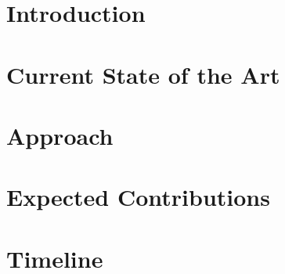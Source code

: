 \documentclass{article}
\author{
    Lillian Tsai\\
    Massachusetts Institute of Technology\\
    \texttt{tsilyai@mit.edu}
}
\date{\mydate}
\title{\mytitle}
\begin{document}


\newpage

\maketitle

\section{Introduction}%


\section{Current State of the Art}%


\section{Approach}%


\section{Expected Contributions}%


\section{Timeline}%


\begin{spacing}{1}
{}

\end{spacing}
%
%


\end{document}
